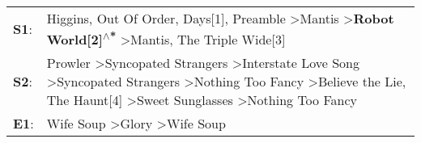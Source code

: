 \begin{supertabular}{p{0.03\textwidth}p{0.92\textwidth}}
 \textbf{S1}:  &                                                                                                                            Higgins\textsuperscript{}, \enspace Out Of Order\textsuperscript{},  Days[1]\textsuperscript{}, \enspace Preamble\textsuperscript{} \textgreater \enspace Mantis\textsuperscript{} \textgreater \enspace \textbf{Robot World[2]\textsuperscript{$\wedge$*}} \textgreater \enspace Mantis\textsuperscript{}, \enspace The Triple Wide[3]\textsuperscript{}  \enspace  \\
 \textbf{S2}:  &  Prowler\textsuperscript{} \textgreater \enspace Syncopated Strangers\textsuperscript{} \textgreater \enspace Interstate Love Song\textsuperscript{} \textgreater \enspace Syncopated Strangers\textsuperscript{} \textgreater \enspace Nothing Too Fancy\textsuperscript{} \textgreater \enspace Believe the Lie\textsuperscript{}, \enspace The Haunt[4]\textsuperscript{} \textgreater \enspace Sweet Sunglasses\textsuperscript{} \textgreater \enspace Nothing Too Fancy\textsuperscript{}  \enspace  \\
 \textbf{E1}:  &                                                                                                                                                                                                                                                                                                                                                                     Wife Soup\textsuperscript{} \textgreater \enspace Glory\textsuperscript{} \textgreater \enspace Wife Soup\textsuperscript{}  \enspace  \\
\end{supertabular}
